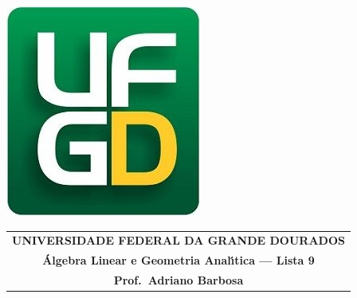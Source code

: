 \documentclass[a4paper,5pt]{amsbook}
\begin{document}
\thispagestyle{empty}
\pagestyle{empty}
\begin{minipage}[h]{0.14\textwidth}
	\includegraphics[scale=0.24]{../../ufgd.png}
\end{minipage}
\begin{minipage}[h]{\textwidth}
\begin{tabular}{c}
{{\bf UNIVERSIDADE FEDERAL DA GRANDE DOURADOS}}\\
{{\bf \'{A}lgebra Linear e Geometria Anal\'{\i}tica --- Lista 9}}\\
{{\bf Prof.\ Adriano Barbosa}}\\
\end{tabular}
\vspace{-0.45cm}
%
\end{minipage}

\end{document}
